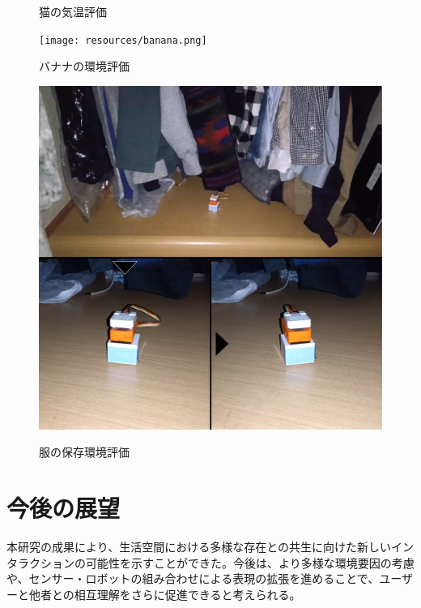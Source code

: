 \documentclass[paper=a4paper,jafontsize=9pt,head_space=15mm,gutter=20mm,twocolumn,number_of_lines=49,
line_length=26zw]{myuarticle}
\begin{document}
\begin{figure}[hb]
\begin{center}
\begin{minipage}[b]{0.24\textwidth}
      \caption{猫の気温評価}
    \end{minipage}
    \begin{minipage}[b]{0.24\textwidth}
      \centering
      \texttt{[image: resources/banana.png]}
      \caption{バナナの環境評価}
    \end{minipage}
    \begin{minipage}[b]{0.24\textwidth}
      \centering
      \includegraphics[keepaspectratio, scale=0.1]{resources/clothes.png}
      \caption{服の保存環境評価}
    \end{minipage}
    \label{fig:system-test}
  \end{center}
\end{figure}

\section*{今後の展望}
本研究の成果により、生活空間における多様な存在との共生に向けた新しいインタラクションの可能性を示すことができた。今後は、より多様な環境要因の考慮や、センサー・ロボットの組み合わせによる表現の拡張を進めることで、ユーザーと他者との相互理解をさらに促進できると考えられる。
\end{document}
